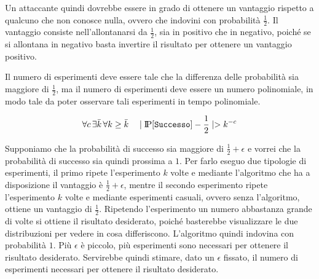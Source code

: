 Un attaccante quindi dovrebbe essere in grado di ottenere un vantaggio rispetto 
a qualcuno che non conosce nulla, ovvero che indovini con probabilità $\frac{1}{2}$.
Il vantaggio consiste nell'allontanarsi da $\frac{1}{2}$, sia in positivo che in negativo, 
poiché se si allontana in negativo basta invertire il risultato per ottenere
un vantaggio positivo.

Il numero di esperimenti deve essere tale che la differenza delle probabilità sia
maggiore di $\frac{1}{2}$, ma il numero di esperimenti deve essere un numero 
polinomiale, in modo tale da poter osservare tali esperimenti in tempo polinomiale.
\begin{tcolorbox}[title = Sicurezza]
  \begin{equation}
    \forall c \, \exists \bar{k} \, \forall k \geq \bar{k} \quad \mid \text{I\kern-0.15em P}[\texttt{Successo}] - \frac{1}{2} \mid  > k^{-c}
  \end{equation}
\end{tcolorbox}
Supponiamo che la probabilità di successo sia maggiore di $\frac{1}{2} + \epsilon$ e vorrei che la probabilità di successo sia quindi 
prossima a $1$. Per farlo eseguo due tipologie di esperimenti, il primo ripete l'esperimento $k$ volte e mediante l'algoritmo che 
ha a disposizione il vantaggio è $\frac{1}{2} + \epsilon$, mentre il secondo esperimento ripete l'esperimento $k$ volte e mediante
esperimenti casuali, ovvero senza l'algoritmo, ottiene un vantaggio di $\frac{1}{2}$. Ripetendo l'esperimento un numero abbastanza grande di 
volte si ottiene il risultato desiderato, poiché basterebbe visualizzare le due distribuzioni per vedere in cosa differiscono. L'algoritmo 
quindi indovina con probabilità $1$. Più $\epsilon$ è piccolo, più esperimenti sono necessari per ottenere il risultato desiderato. 
Servirebbe quindi stimare, dato un $\epsilon$ fissato, il numero di esperimenti necessari per ottenere il risultato desiderato.
